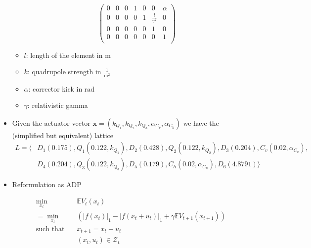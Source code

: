 \begin{itemize}
\begin{itemize}
\begin{equation*}
\begin{pmatrix}
                                                                     0 & 0 & 0 & 1 & 0 & 0 & \alpha \\ %
                                                                     0 & 0 & 0 & 0 & 1 & \frac{l}{\gamma^2} & 0 \\ %
                                                                     0 & 0 & 0 & 0 & 0 & 1 & 0 \\ %
                                                                     0 & 0 & 0 & 0 & 0 & 0 & 1 \\
                                                                 \end{pmatrix}
            \end{equation*}
    \end{itemize}
    \begin{itemize}
        \item $l$: length of the element in $\text{m}$
        \item $k$: quadrupole strength in $\frac{1}{\text{m}^2}$
        \item $\alpha$: corrector kick in $\text{rad}$
        \item $\gamma$: relativistic gamma  
    \end{itemize}
    
    \item Given the actuator vector $\bm{x} = (k_{Q_1}, k_{Q_2}, k_{Q_3}, \alpha_{C_v}, \alpha_{C_h})$ we have the (simplified but equivalent) lattice
    \begin{equation*}
    \begin{aligned}
        L = \langle & D_1(0.175), Q_1(0.122,k_{Q_1}), D_2(0.428), Q_2(0.122,k_{Q_2}), D_3(0.204), C_v(0.02,\alpha_{C_v}), \\ & D_4(0.204), Q_3(0.122,k_{Q_3}), D_5(0.179), C_h(0.02,\alpha_{C_h}), D_6(4.8791) \rangle
    \end{aligned}
    \end{equation*}
    
    
    \item Reformulation as ADP
    
    \begin{align*}
        \min_{x_t} \quad&\mathbb{E} V_t(x_t)\\ = \min_{x_t} \quad& \left(|f(x_t)|_1-|f(x_t+u_t)|_1 +\gamma \mathbb{E} V_{t+1}(x_{t+1}) \right)\\
        \text{such that} \quad &x_{t+1}=x_t+u_t\\
        & (x_t,u_t)\in\mathcal{Z}_t 
    \end{align*}
\end{itemize}

